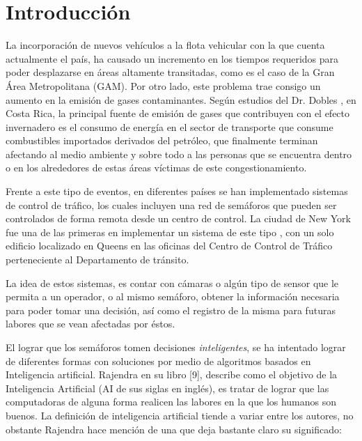 \chapter*{Introducci\'{o}n}
	\label{chap:introduction}
 

		 
		La incorporaci\'{o}n de nuevos veh\'{i}culos a la flota vehicular con la que cuenta
	actualmente el pa\'{i}s, ha causado un incremento en los tiempos requeridos para
	poder desplazarse en \'{a}reas altamente transitadas, como es el caso de la Gran
	\'{A}rea Metropolitana (GAM). Por otro lado, este problema trae consigo un aumento
	en la emisi\'{o}n de gases contaminantes. Seg\'{u}n estudios del Dr. Dobles
	\cite{Robles2011} , en Costa Rica, la principal fuente de emisi\'{o}n de gases que contribuyen con el efecto invernadero es el consumo de energ\'{i}a en el sector de transporte que consume combustibles importados derivados del petr\'{o}leo, que finalmente terminan afectando al medio ambiente y sobre todo a las personas que se encuentra dentro o en los alrededores de estas \'{a}reas v\'{i}ctimas de este congestionamiento.
	
		Frente a este tipo de eventos, en diferentes pa\'{i}ses se han implementado
	sistemas de control de tr\'{a}fico, los cuales incluyen una red de sem\'{a}foros que
	pueden ser controlados de forma remota desde un centro de control. La ciudad de
	New York fue una de las primeras en implementar un sistema de este tipo
	\cite{Greenman1998}, con un solo edificio localizado en Queens en las oficinas
	del Centro de Control de Tr\'{a}fico perteneciente al Departamento de tr\'{a}nsito.
	
		La idea de estos sistemas, es contar con c\'{a}maras o alg\'{u}n tipo de sensor que le
	permita a un operador, o al mismo sem\'{a}foro, obtener la informaci\'{o}n necesaria
	para poder tomar una decisi\'{o}n, as\'{i} como el registro de la misma para futuras
	labores que se vean afectadas por \'{e}stos.
	
		El lograr que los sem\'{a}foros tomen decisiones \textit{inteligentes}, se ha
	intentado lograr de diferentes formas con soluciones por medio de  algoritmos basados en Inteligencia
	artificial. Rajendra en su libro [9], describe como el objetivo de la
	Inteligencia Artificial (AI de sus siglas en ingl\'{e}s), es tratar de lograr que
	las computadoras de alguna forma realicen las labores en la que los humanos son
	buenos. La definici\'{o}n de inteligencia artificial tiende a variar entre los
	autores, no obstante Rajendra hace menci\'{o}n de una que deja bastante claro su significado:

